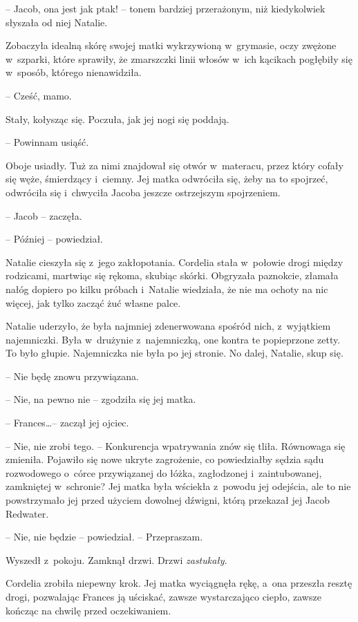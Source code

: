 \documentclass[oneside,polish,11pt,sfheadings]{mwbk}
\begin{document}
-- Jacob, ona jest jak ptak! -- tonem bardziej przerażonym, niż kiedykolwiek słyszała od niej Natalie.

Zobaczyła idealną skórę swojej matki wykrzywioną w~grymasie, oczy
zwężone w~szparki, które sprawiły, że zmarszczki linii włosów w~ich
kącikach pogłębiły się w~sposób, którego nienawidziła.

-- Cześć, mamo.

Stały, kołysząc się. Poczuła, jak jej nogi się poddają.

-- Powinnam usiąść.

Oboje usiadły. Tuż za nimi znajdował się otwór w~materacu, przez który
cofały się węże, śmierdzący i~ciemny. Jej matka odwróciła się, żeby na
to spojrzeć, odwróciła się i~chwyciła Jacoba jeszcze ostrzejszym
spojrzeniem.

-- Jacob -- zaczęła.

-- Później -- powiedział.

Natalie cieszyła się z~jego zakłopotania. Cordelia stała w~połowie drogi
między rodzicami, martwiąc się rękoma, skubiąc skórki. Obgryzała
paznokcie, złamała nałóg dopiero po kilku próbach i~Natalie wiedziała,
że nie ma ochoty na nic więcej, jak tylko zacząć żuć własne palce.

Natalie uderzyło, że była najmniej zdenerwowana spośród nich, z~wyjątkiem najemniczki. Była w~drużynie z~najemniczką, one kontra te
popieprzone zetty. To było głupie. Najemniczka nie była po jej stronie.
No dalej, Natalie, skup się.

-- Nie będę znowu przywiązana.

-- Nie, na pewno nie -- zgodziła się jej matka.

-- Frances\ldots  -- zaczął jej ojciec.

-- Nie, nie zrobi tego. -- Konkurencja wpatrywania znów się tliła.
Równowaga się zmieniła. Pojawiło się nowe ukryte zagrożenie, co
powiedziałby sędzia sądu rozwodowego o~córce przywiązanej do łóżka,
zagłodzonej i~zaintubowanej, zamkniętej w~schronie? Jej matka była
wściekła z~powodu jej odejścia, ale to nie powstrzymało jej przed
użyciem dowolnej dźwigni, którą przekazał jej Jacob Redwater.

-- Nie, nie będzie -- powiedział. -- Przepraszam.

Wyszedł z~pokoju.
Zamknął drzwi. Drzwi \textit{zastukały}.

Cordelia zrobiła niepewny krok. Jej matka wyciągnęła rękę, a~ona
przeszła resztę drogi, pozwalając Frances ją uściskać, zawsze
wystarczająco ciepło, zawsze kończąc na chwilę przed oczekiwaniem.
\end{document}

